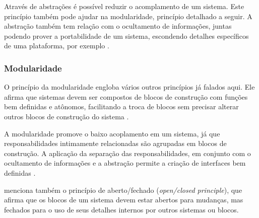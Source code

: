\documentclass[diss]{template/setrem}
\begin{document}
Através de abstrações é possível reduzir o acomplamento de um sistema. Este princípio também pode ajudar na modularidade, princípio detalhado a seguir. A abstração também tem relação com o ocultamento de informações, juntas podendo prover a portabilidade de um sistema, escondendo detalhes específicos de uma plataforma, por exemplo \citep{Vogel2011}.

\subsubsection{Modularidade}
O princípio da modularidade engloba vários outros princípios já falados aqui. Ele afirma que sistemas devem ser compostos de blocos de construção com funções bem definidas e atônomos, facilitando a troca de blocos sem precisar alterar outros blocos de construção do sistema \citep{Vogel2011}.

A modularidade promove o baixo acoplamento em um sistema, já que responsabilidades intimamente relacionadas são agrupadas em blocos de construção. A aplicação da separação das responsabilidades, em conjunto com o ocultamento de informações e a abstração permite a criação de interfaces bem definidas \citep{Vogel2011}.

\citet{Vogel2011} menciona também o princípio de aberto/fechado (\emph{open/closed principle}), que afirma que os blocos de um sistema devem estar abertos para mudanças, mas fechados para o uso de seus detalhes internos por outros sistemas ou blocos.
\end{document}
